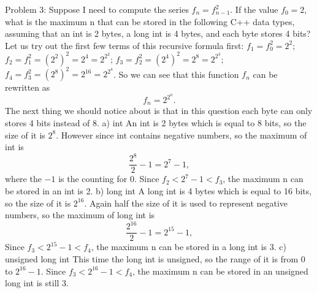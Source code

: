 \documentclass[a4paper,12pt]{article}
\begin{document}
\noindent Problem 3: Suppose I need to compute the series $f_{n}=f^{2}_{n-1}$. If the value $f_0 = 2$, what is the maximum n that can be stored in the following C++ data types, assuming that an int is 2 bytes, a long int is 4 bytes, and each byte stores 4 bits?
\newline
\hfill\break
Let us try out the first few terms of this recursive formula first: 
$f_{1}=f^{2}_{0}=2^2$;
$f_{2}=f^{2}_{1}=(2^2)^2=2^4=2^{2^2}$;
$f_{3}=f^{2}_{2}=(2^4)^2=2^8=2^{2^3}$;
$f_{4}=f^{2}_{3}=(2^8)^2=2^{16}=2^{2^4}$.
\newline
So we can see that this function $f_{n}$ can be rewritten as
\begin{equation}
 f_{n}=2^{2^{n}}. 
\end{equation}
\newline
The next thing we should notice about is that in this question each byte can only stores 4 bits instead of 8. 
\newline
\hfill\break
a) int
\newline
An int is 2 bytes which is equal to 8 bits, so the size of it is $2^8$. However since int contains negative numbers, so the maximum of int is 
\begin{equation}
\frac{2^8}{2}-1=2^7-1, 
\end{equation}
where the $-1$ is the counting for 0. Since $f_{2}<2^7-1<f_{3}$, the maximum n can be stored in an int is 2.   
\newline
\hfill\break
b) long int
\newline
A long int is 4 bytes which is equal to 16 bits, so the size of it is $2^{16}$. Again half the size of it is used to represent negative numbers, so the maximum of long int is
\begin{equation}
\frac{2^{16}}{2}-1=2^{15}-1, 
\end{equation}
Since $f_{3}<2^{15}-1<f_{4}$, the maximum n can be stored in a long int is 3.   
\newline
\hfill\break
c) unsigned long int
\newline
This time the long int is unsigned, so the range of it is from 0 to $2^{16}-1$. Since $f_{3}<2^{16}-1<f_{4}$, the maximum n can be stored in an unsigned long int is still 3.     
\end{document}
